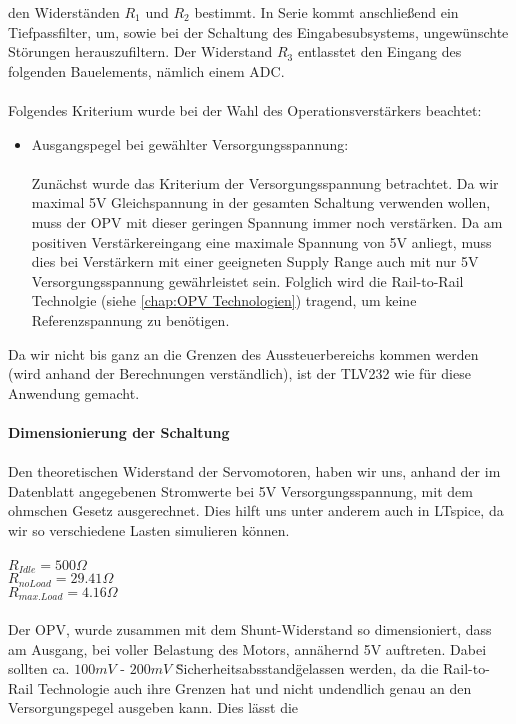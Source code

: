 \documentclass[titlepage,12pt,twoside]{article}
\begin{document}
den Widerständen $R_{1}$ und $R_{2}$ bestimmt. In Serie kommt anschließend ein Tiefpassfilter, um, sowie bei der Schaltung des Eingabesubsystems,
ungewünschte Störungen herauszufiltern. Der Widerstand $R_{3}$ entlasstet den Eingang des folgenden Bauelements, nämlich einem ADC. \\
\\
Folgendes Kriterium wurde bei der Wahl des Operationsverstärkers beachtet:
\begin{itemize}
	\item Ausgangspegel bei gewählter Versorgungsspannung: \\
		  \\
		  Zunächst wurde das Kriterium der Versorgungsspannung betrachtet. Da wir maximal
		  5V Gleichspannung in der gesamten Schaltung verwenden wollen, muss der OPV mit
		  dieser geringen Spannung immer noch verstärken. Da am positiven Verstärkereingang
		  eine maximale Spannung von 5V anliegt, muss dies bei Verstärkern mit einer geeigneten
		  Supply Range auch mit nur 5V Versorgungsspannung gewährleistet sein. Folglich wird
		  die Rail-to-Rail Technolgie (siehe \autoref{chap:OPV Technologien}) tragend, um keine Referenzspannung
		  zu benötigen.
\end{itemize}
Da wir nicht bis ganz an die Grenzen des Aussteuerbereichs kommen werden (wird anhand der Berechnungen verständlich), ist der TLV232 wie für diese Anwendung gemacht. \\
\\
\textbf{Dimensionierung der Schaltung} \\
\\
Den theoretischen Widerstand der Servomotoren, haben wir uns, anhand der im Datenblatt angegebenen Stromwerte bei 5V Versorgungsspannung, mit dem ohmschen Gesetz ausgerechnet.
Dies hilft uns unter anderem auch in LTspice, da wir so verschiedene Lasten simulieren können. \\
\\
$R_{Idle} = 500\Omega$ \\
$R_{no Load} = 29.41\Omega$ \\
$R_{max. Load} = 4.16\Omega$ \\
\\
Der OPV, wurde zusammen mit dem Shunt-Widerstand so dimensioniert, dass am Ausgang, bei voller Belastung des Motors, annähernd 5V auftreten. Dabei sollten ca. $100mV$ - $200mV$ 
\"Sicherheitsabsstand\" gelassen werden, da die Rail-to-Rail Technologie auch ihre Grenzen hat und nicht undendlich genau an den Versorgungspegel ausgeben kann. Dies lässt die 
\end{document}
